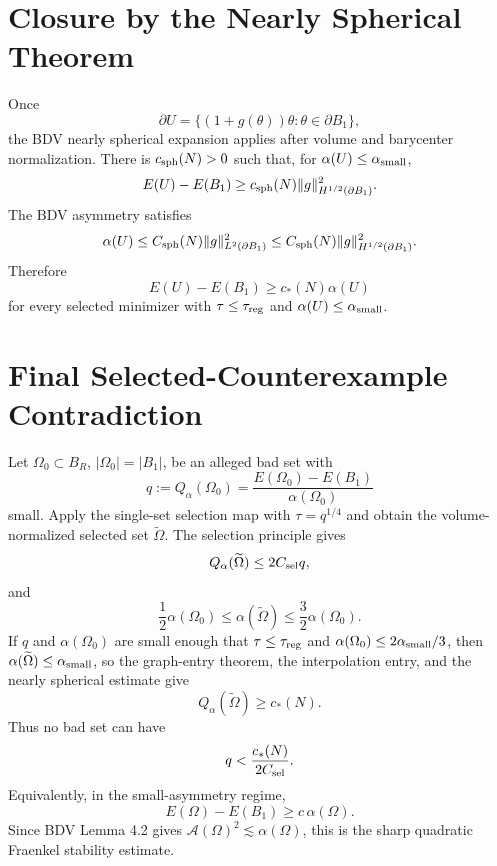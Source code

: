 \documentclass[11pt]{article}
\begin{document}
\section{Closure by the Nearly Spherical Theorem}

Once
\[
\partial U=\{(1+g(\theta))\theta:\theta\in\partial B_1\},
\]
the BDV nearly spherical expansion applies after volume and barycenter
normalization. There is \(c_{\rm sph}(N)>0\) such that, for
\(\alpha(U)\le\alpha_{\rm small}\),
\[
E(U)-E(B_1)
\ge c_{\rm sph}(N)\|g\|_{H^{1/2}(\partial B_1)}^2.
\]
The BDV asymmetry satisfies
\[
\alpha(U)\le C_{\rm sph}(N)\|g\|_{L^2(\partial B_1)}^2
\le C_{\rm sph}(N)\|g\|_{H^{1/2}(\partial B_1)}^2.
\]
Therefore
\[
\boxed{
E(U)-E(B_1)\ge c_*(N)\alpha(U)
}
\]
for every selected minimizer with
\(\tau\le\tau_{\rm reg}\) and \(\alpha(U)\le\alpha_{\rm small}\).

\section{Final Selected-Counterexample Contradiction}

Let \(\Omega_0\subset B_R\), \(|\Omega_0|=|B_1|\), be an alleged bad set with
\[
q:=Q_\alpha(\Omega_0)
=\frac{E(\Omega_0)-E(B_1)}{\alpha(\Omega_0)}
\]
small. Apply the single-set selection map with \(\tau=q^{1/4}\) and obtain the
volume-normalized selected set \(\widetilde\Omega\). The selection principle
gives
\[
Q_\alpha(\widetilde\Omega)\le 2C_{\rm sel}q,
\]
and
\[
\frac12\alpha(\Omega_0)
\le
\alpha(\widetilde\Omega)
\le
\frac32\alpha(\Omega_0).
\]
If \(q\) and \(\alpha(\Omega_0)\) are small enough that
\(\tau\le\tau_{\rm reg}\) and
\(\alpha(\Omega_0)\le 2\alpha_{\rm small}/3\), then
\(\alpha(\widetilde\Omega)\le\alpha_{\rm small}\), so the graph-entry theorem,
the interpolation entry, and the nearly spherical estimate give
\[
Q_\alpha(\widetilde\Omega)\ge c_*(N).
\]
Thus no bad set can have
\[
q<\frac{c_*(N)}{2C_{\rm sel}}.
\]
Equivalently, in the small-asymmetry regime,
\[
E(\Omega)-E(B_1)\ge c\,\alpha(\Omega).
\]
Since BDV Lemma 4.2 gives \(\mathcal A(\Omega)^2\lesssim \alpha(\Omega)\),
this is the sharp quadratic Fraenkel stability estimate.
\end{document}
